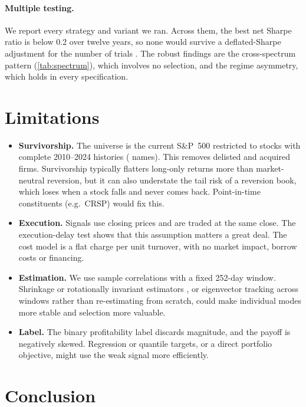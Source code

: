 \paragraph{Multiple testing.} We report every strategy and variant we
ran. Across them, the best net Sharpe ratio is below 0.2 over twelve
years, so none would survive a deflated-Sharpe adjustment for the
number of trials \citep{baileylopezdeprado2014}. The robust findings
are the cross-spectrum pattern (\cref{tab:spectrum}), which involves
no selection, and the regime asymmetry, which holds in every
specification.

\section{Limitations}
\label{sec:limitations}

\begin{itemize}
\item \textbf{Survivorship.} The universe is the current S\&P~500
  restricted to stocks with complete 2010--2024 histories (\DataAssets{}
  names). This removes delisted and acquired firms. Survivorship
  typically flatters long-only returns more than market-neutral
  reversion, but it can also understate the tail risk of a reversion
  book, which loses when a stock falls and never comes back.
  Point-in-time constituents (e.g.\ CRSP) would fix this.
\item \textbf{Execution.} Signals use closing prices and are traded at
  the same close. The execution-delay test shows that this assumption
  matters a great deal. The cost model is a flat charge per unit
  turnover, with no market impact, borrow costs or financing.
\item \textbf{Estimation.} We use sample correlations with a fixed
  252-day window. Shrinkage or rotationally invariant estimators
  \citep{bunbouchaud2017}, or eigenvector tracking across windows
  rather than re-estimating from scratch, could make individual modes
  more stable and selection more valuable.
\item \textbf{Label.} The binary profitability label discards magnitude,
  and the payoff is negatively skewed. Regression or quantile targets,
  or a direct portfolio objective, might use the weak signal more
  efficiently.
\end{itemize}

\section{Conclusion}

